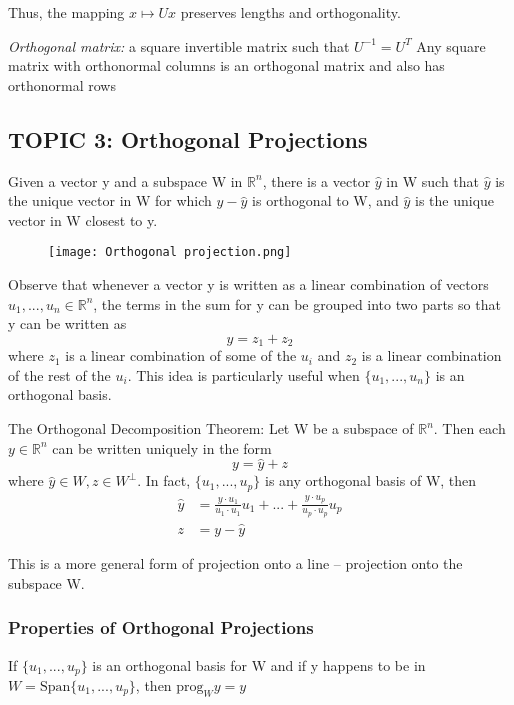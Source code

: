 \documentclass[12pt]{article} %
\newcommand{\R}{\mathbb{R}}
\begin{document}
Thus, the mapping $x \mapsto Ux$ preserves lengths and orthogonality.

\emph{Orthogonal matrix:} a square invertible matrix such that $U^{-1} = U^T$
Any square matrix with orthonormal columns is an orthogonal matrix and also has orthonormal rows


\subsection{TOPIC 3: Orthogonal Projections}
Given a vector y and a subspace W in $\R^n$, there is a vector $\hat{y}$ in W such that $\hat{y}$ is the unique vector in W for which $y - \hat{y}$ is orthogonal to W, and $\hat{y}$ is the unique vector in W closest to y. 

\begin{figure}[h]
	\centering
	\texttt{[image: Orthogonal projection.png]}
\end{figure}

Observe that whenever a vector y is written as a linear combination of vectors $u_1, ..., u_n \in \R^n$, the terms in the sum for y can be grouped into two parts so that y can be written as 
$$y = z_1 + z_2$$
where $z_1$ is a linear combination of some of the $u_i$ and $z_2$ is a linear combination of the rest of the $u_i$. This idea is particularly useful when $\{u_1, ..., u_n\}$ is an orthogonal basis. 

The Orthogonal Decomposition Theorem: 
Let W be a subspace of $\R^n$. Then each $y \in \R^n$ can be written uniquely in the form
$$y = \hat{y} + z$$
where $\hat{y} \in W, z \in W^\perp$. In fact, $\{u_1, ..., u_p\}$ is any orthogonal basis of W, then 
\begin{align*}
	\hat{y} &= \frac{y \cdot u_1}{u_1 \cdot u_1} u_1 + ... + \frac{y \cdot u_p}{u_p \cdot u_p} u_p\\
	z &= y - \hat{y}
\end{align*}

This is a more general form of projection onto a line -- projection onto the subspace W. 

\subsubsection{Properties of Orthogonal Projections}
If $\{u_1, ..., u_p\}$ is an orthogonal basis for W and if y happens to be in $W = \text{Span}\{u_1, ..., u_p\}$, then $\text{prog}_W y = y$ 
\end{document}
